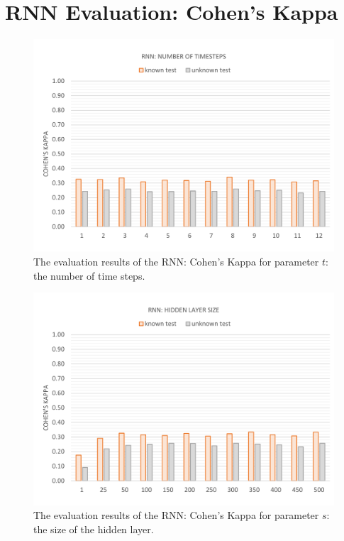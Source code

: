 \newpage

\section{RNN Evaluation: Cohen's Kappa}\label{c.appendix.kappa.rnn}
\vspace{-13mm}
\begin{figure}[H]
	\centering\includegraphics[width=\textwidth]{images/evaluation_rnn_t_k}
	\caption[RNN Evaluation: Number of Time Steps]{The evaluation results of the RNN: Cohen's Kappa for parameter $t$: the number of time steps.}
	\label{f.evaluation.rnn.t.k}
\end{figure}

\vspace{-13mm}
\begin{figure}[H]
	\centering\includegraphics[width=\textwidth]{images/evaluation_rnn_s_k}
	\caption[RNN Evaluation: Hidden Layer Size]{The evaluation results of the RNN: Cohen's Kappa for parameter $s$: the size of the hidden layer.}
	\label{f.evaluation.rnn.s.k}
\end{figure}

